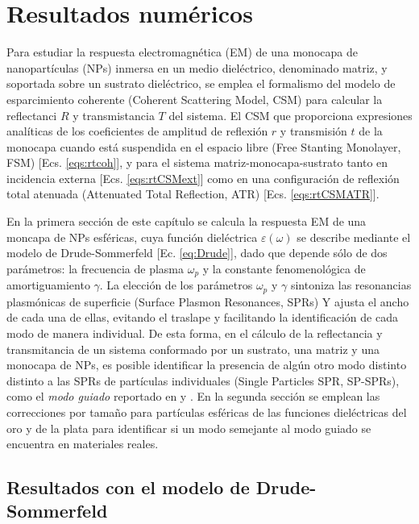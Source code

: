\chapter{Resultados numéricos}

Para estudiar la respuesta electromagnética (EM) de una monocapa de nanopartículas (NPs) inmersa en un medio dieléctrico, denominado matriz, y soportada sobre un sustrato dieléctrico, se emplea el formalismo del modelo de esparcimiento coherente (Coherent Scattering Model, CSM) para calcular la reflectanci $R$ y transmistancia $T$ del sistema. El CSM que proporciona expresiones analíticas de los coeficientes de amplitud de reflexión $r$ y transmisión $t$ de la monocapa cuando está suspendida en el espacio libre (Free Stanting Monolayer, FSM) [Ecs. \eqref{eqs:rtcoh}], y para el sistema matriz-monocapa-sustrato tanto en incidencia externa [Ecs. \eqref{eqs:rtCSMext}] como en una configuración de reflexión total atenuada  (Attenuated Total Reflection, ATR) [Ecs. \eqref{eqs:rtCSMATR}].

En la primera sección de este capítulo se calcula la respuesta EM de una moncapa de NPs esféricas, cuya  función dieléctrica $\varepsilon(\omega)$ se describe mediante el modelo de Drude-Sommerfeld [Ec. \eqref{eq:Drude}], dado que depende sólo de dos parámetros: la frecuencia de plasma $\omega_p$ y la constante fenomenológica de amortiguamiento $\gamma$. La elección de los parámetros $\omega_p$ y $\gamma$ sintoniza las resonancias plasmónicas de superficie (Surface Plasmon Resonances, SPRs) Y ajusta el ancho de cada una de ellas, evitando el traslape y facilitando la identificación de cada modo de manera individual. De esta forma, en el cálculo de la reflectancia y transmitancia de un sistema conformado por un sustrato, una matriz y una monocapa de NPs, es posible identificar la presencia de algún otro modo  distinto distinto a las SPRs de partículas individuales (Single Particles SPR, SP-SPRs), como el \emph{modo guiado} reportado en \cite{kabashin2009plasmonic} y \cite{danilov2018ultra}. En la segunda sección se emplean las correcciones por tamaño para partículas esféricas de las funciones dieléctricas del oro y de la plata para identificar si un modo semejante al modo guiado se encuentra en materiales reales.

\section{Resultados con el modelo de Drude-Sommerfeld}

